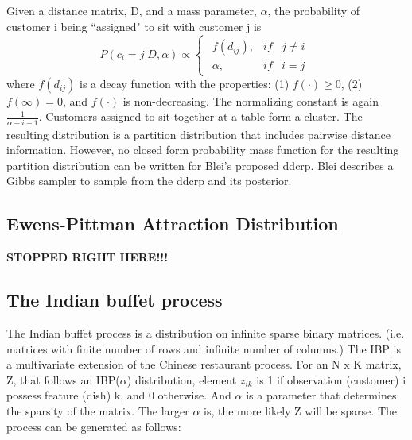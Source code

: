 \noindent
Given a distance matrix, D, and a mass parameter, $\alpha$, the probability
of customer i being ``assigned" to sit with customer j is 
\begin{equation}
  P(c_i=j|D,\alpha) \propto 
  \begin{cases}
    \begin{array}{rll}
      f(d_{ij}), & if & j \ne i\\
      \alpha,    & if & i=j
    \end{array}  
  \end{cases}
\end{equation}
where $f(d_{ij})$ is a decay function with the properties: (1) $f(\cdot) \ge 0$,
(2) $f(\infty) = 0$, and $f(\cdot)$ is non-decreasing. The normalizing constant 
is again $\frac{1}{\alpha+i-1}$. Customers assigned to sit together at a table
form a cluster. The resulting distribution is a partition distribution that
includes pairwise distance information. However, no closed form probability 
mass function for the resulting partition distribution can be written for 
Blei's proposed ddcrp. Blei describes a Gibbs sampler to sample from the 
ddcrp and its posterior.

\subsection{Ewens-Pittman Attraction Distribution}
\textbf{STOPPED RIGHT HERE!!!}



\subsection{The Indian buffet process}
The Indian buffet process is a distribution on infinite sparse binary matrices.
(i.e. matrices with finite number of rows and infinite number of columns.) The
IBP is a multivariate extension of the Chinese restaurant process. For an N x K
matrix, Z, that follows an IBP($\alpha$) distribution, element $z_{ik}$ is 1 if
observation (customer) i possess feature (dish) k, and 0 otherwise.  And
$\alpha$ is a parameter that determines the sparsity of the matrix. The larger
$\alpha$ is, the more likely Z will be sparse. The process can be generated as
follows: \\

